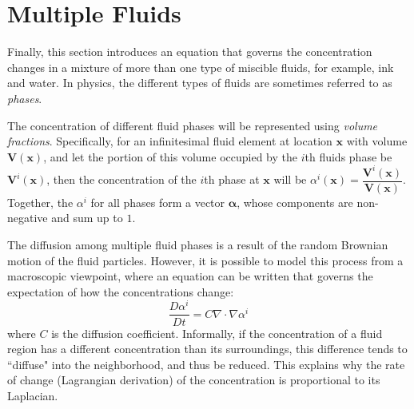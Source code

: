\section{Multiple Fluids}
\label{section multiple fluids}
Finally, this section introduces an equation that governs the concentration changes in a mixture of more than one type of miscible fluids, for example, ink and water. In physics, the different types of fluids are sometimes referred to as \textit{phases}.

The concentration of different fluid phases will be represented using \textit{volume fractions}. Specifically, for an infinitesimal fluid element at location $\textbf{x}$ with volume $\textbf{V}(\textbf{x})$, and let the portion of this volume occupied by the $i$th fluids phase be $\textbf{V}^i(\textbf{x})$, then the concentration of the $i$th phase at $\textbf{x}$ will be $\alpha^i(\textbf{x}) = \dfrac{\textbf{V}^i(\textbf{x})}{\textbf{V}(\textbf{x})}$. Together, the $\alpha^i$ for all phases form a vector $\bm{\alpha}$, whose components are non-negative and sum up to $1$.

The diffusion among multiple fluid phases is a result of the random Brownian motion of the fluid particles. However, it is possible to model this process from a macroscopic viewpoint, where an equation can be written that governs the expectation of how the concentrations change:
\begin{equation}
    \tag{Advection-Diffusion Equation}
    \frac{D \alpha^i}{D t} = C\nabla \cdot \nabla \alpha^i
\end{equation}
where $C$ is the diffusion coefficient. Informally, if the concentration of a fluid region has a different concentration than its surroundings, this difference tends to ``diffuse" into the neighborhood, and thus be reduced. This explains why the rate of change (Lagrangian derivation) of the concentration is proportional to its Laplacian.
